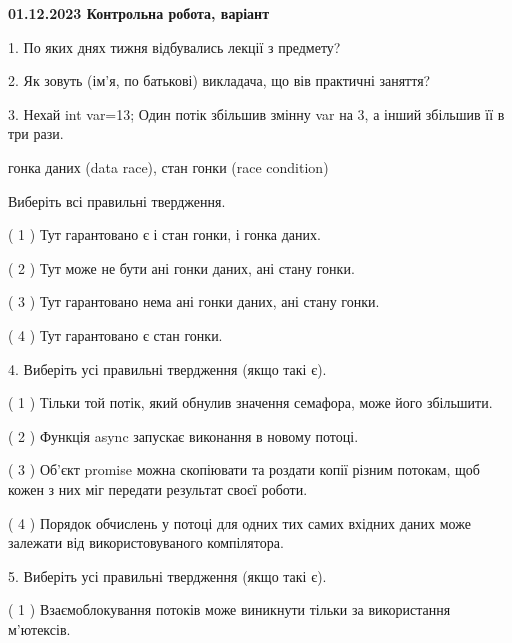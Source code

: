 \documentclass[12pt, ukrainian]{article}
\begin{document}
\vspace{4mm}
\newpage
\begin {large}

\textbf{01.12.2023 Контрольна робота, варіант  }\par


{
1. По яких днях тижня відбувались лекції з предмету?



\vspace{5mm}
2. Як зовуть (ім'я, по батькові) викладача, що вів практичні заняття?



\vspace{5mm}
3. Нехай int var=13; Один потік збільшив змінну var на 3, а інший збільшив її в три рази.

гонка даних (data race), стан гонки (race condition)

Виберіть всі правильні твердження.\par
\vspace{2mm}
( 1 ) Тут гарантовано є і стан гонки, і гонка даних.%

( 2 ) Тут може не бути ані гонки даних, ані стану гонки.%

( 3 ) Тут гарантовано нема ані гонки даних, ані стану гонки.%

( 4 ) Тут гарантовано є стан гонки.%


\vspace{5mm}
4. Виберіть усі правильні твердження (якщо такі є).\par
\vspace{2mm}

( 1 ) Тільки той потік, який обнулив значення семафора, може його збільшити.%

( 2 ) Функція async запускає виконання в новому потоці.%

( 3 ) Об’єкт promise можна скопіювати та роздати копії різним потокам, щоб кожен з них міг передати результат своєї роботи.%

( 4 ) Порядок обчислень у потоці для одних тих самих вхідних даних може залежати від використовуваного компілятора.%


\vspace{5mm}
5. Виберіть усі правильні твердження (якщо такі є).\par
\vspace{2mm}

( 1 ) Взаємоблокування потоків може виникнути тільки за використання м’ютексів.%

}
\end{large}
\end{document}
